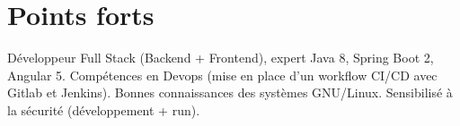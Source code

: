 \documentclass[a4paper]{twentysecondcv} %
\begin{document}



\skillstext{}


\aboutme{} %
	


\makeprofile %


\section{Points forts}

Développeur Full Stack (Backend + Frontend), expert Java 8, Spring Boot 2, Angular 5.
Compétences en Devops (mise en place d'un workflow CI/CD avec Gitlab et Jenkins).
Bonnes connaissances des systèmes GNU/Linux. Sensibilisé à la sécurité (développement + run).
\end{document}
